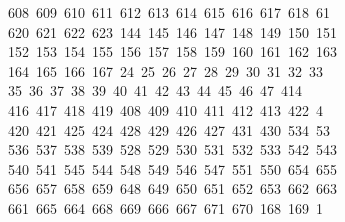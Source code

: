\begin{tabbing}
\ 608\ 609\ 610\ 611\ 612\ 613\ 614\ 615\ 616\ 617\ 618\ 61\\[0pt]
\ 620\ 621\ 622\ 623\ 144\ 145\ 146\ 147\ 148\ 149\ 150\ 151\\[0pt]
\>\ 152\ 153\ 154\ 155\ 156\ 157\ 158\ 159\ 160\ 161\ 162\ 163\\[0pt]
\>\ 164\ 165\ 166\ 167\ 24\ 25\ 26\ 27\ 28\ 29\ 30\ 31\ 32\ 33\ \\[0pt]
\ 35\ 36\ 37\ 38\ 39\ 40\ 41\ 42\ 43\ 44\ 45\ 46\ 47\ 414\ \\[0pt]
\ 416\ 417\ 418\ 419\ 408\ 409\ 410\ 411\ 412\ 413\ 422\ 4\\[0pt]
\ 420\ 421\ 425\ 424\ 428\ 429\ 426\ 427\ 431\ 430\ 534\ 53\\[0pt]
\ 536\ 537\ 538\ 539\ 528\ 529\ 530\ 531\ 532\ 533\ 542\ 543\\[0pt]
\>\ 540\ 541\ 545\ 544\ 548\ 549\ 546\ 547\ 551\ 550\ 654\ 655\\[0pt]
\>\ 656\ 657\ 658\ 659\ 648\ 649\ 650\ 651\ 652\ 653\ 662\ 663\ \\[0pt]
\ 661\ 665\ 664\ 668\ 669\ 666\ 667\ 671\ 670\ 168\ 169\ 1\\[0pt]

\end{tabbing}

